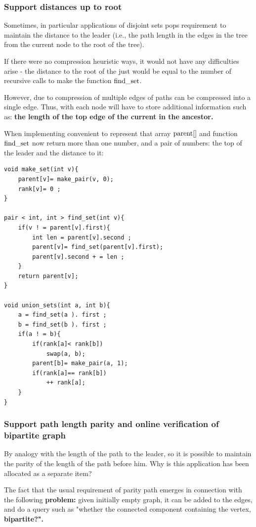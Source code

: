 \subsubsection{ Support distances up to root }

Sometimes, in particular applications of disjoint sets pops requirement to maintain the distance to the leader (i.e., the path length in the edges in the tree from the current node to the root of the tree).

If there were no compression heuristic ways, it would not have any difficulties arise - the distance to the root of the just would be equal to the number of recursive calls to make the function $\rm find \_set$.

However, due to compression of multiple edges of paths can be compressed into a single edge. Thus, with each node will have to store additional information such as: \textbf{the length of the top edge of the current in the ancestor.}

When implementing convenient to represent that array ${\rm parent} []$ and function $\rm find \_set$ now return more than one number, and a pair of numbers: the top of the leader and the distance to it:

\begin{verbatim}
void make_set(int v){
    parent[v]= make_pair(v, 0);
    rank[v]= 0 ;
}
 
pair < int, int > find_set(int v){
    if(v ! = parent[v].first){
        int len = parent[v].second ;
        parent[v]= find_set(parent[v].first);
        parent[v].second + = len ;
    }
    return parent[v];
}
 
void union_sets(int a, int b){
    a = find_set(a ). first ;
    b = find_set(b ). first ;
    if(a ! = b){
        if(rank[a]< rank[b])
            swap(a, b);
        parent[b]= make_pair(a, 1);
        if(rank[a]== rank[b])
            ++ rank[a];
    }
} 
\end{verbatim}
\subsubsection{ Support path length parity and online verification of bipartite graph }

By analogy with the length of the path to the leader, so it is possible to maintain the parity of the length of the path before him. Why is this application has been allocated as a separate item?

The fact that the usual requirement of parity path emerges in connection with the following \textbf{problem:} given initially empty graph, it can be added to the edges, and do a query such as "whether the connected component containing the vertex, \textbf{bipartite?".}

